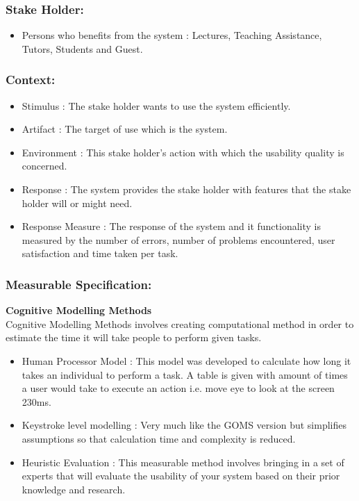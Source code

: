 \documentclass[11pt]{article}
\begin{document}
		\subsubsection{Stake Holder:}
			\begin{itemize}
				\item Persons who benefits from the system : Lectures, Teaching Assistance, Tutors, Students and Guest.
			\end{itemize}
		\subsubsection{Context:}
			\begin{itemize}
				\item Stimulus : The stake holder wants to use the system efficiently.
				\item Artifact : The target of use which is the system.
				\item Environment : This stake holder’s action with which the usability quality is concerned.
				\item Response : The system provides the stake holder with features that the stake holder will or might need.
				\item Response Measure : The response of the system and it functionality is measured by the number of errors, number of problems encountered, user satisfaction and time taken per task.
			\end{itemize}
				
		\subsubsection{Measurable Specification:}
			\textbf{Cognitive Modelling Methods}\\
				Cognitive Modelling Methods involves creating computational method in order to estimate the time it will take people to perform given tasks.
			\begin{itemize}			
			
				\item Human Processor Model : This model was developed to calculate how long it takes an individual to perform a task. A table is given with amount of times a user would take to execute an action i.e. move eye to look at the screen 230ms.
				\item Keystroke level modelling : Very much like the GOMS version but simplifies assumptions so that calculation time and complexity is reduced.
				\item  Heuristic Evaluation	 : This measurable method involves bringing in a set of experts that will evaluate the usability of your system based on their prior knowledge and research. 
			
			\end{itemize}
		
\end{document}
